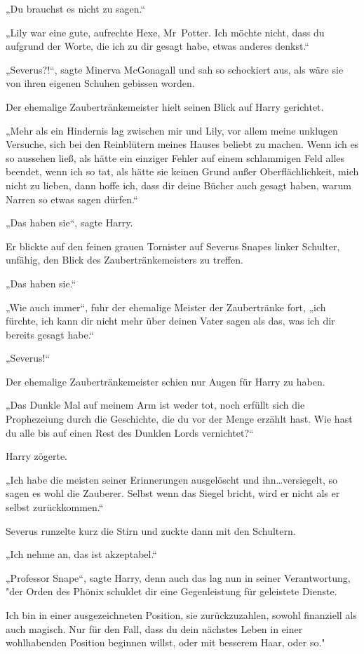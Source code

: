 {„Du brauchst es nicht zu sagen.“

„Lily war eine gute, aufrechte Hexe, Mr~Potter. Ich möchte nicht, dass du aufgrund der Worte, die ich zu dir gesagt habe, etwas anderes denkst.“

„Severus?!“, sagte Minerva McGonagall und sah so schockiert aus, als wäre sie von ihren eigenen Schuhen gebissen worden.

Der ehemalige Zaubertränkemeister hielt seinen Blick auf Harry gerichtet.

„Mehr als ein Hindernis lag zwischen mir und Lily, vor allem meine unklugen Versuche, sich bei den Reinblütern meines Hauses beliebt zu machen. Wenn ich es so aussehen ließ, als hätte ein einziger Fehler auf einem schlammigen Feld alles beendet, wenn ich so tat, als hätte sie keinen Grund außer Oberflächlichkeit, mich nicht zu lieben, dann hoffe ich, dass dir deine Bücher auch gesagt haben, warum Narren so etwas sagen dürfen.“

„Das haben sie“, sagte Harry.

Er blickte auf den feinen grauen Tornister auf Severus Snapes linker Schulter, unfähig, den Blick des Zaubertränkemeisters zu treffen.

„Das haben sie.“

„Wie auch immer“, fuhr der ehemalige Meister der Zaubertränke fort, „ich fürchte, ich kann dir nicht mehr über deinen Vater sagen als das, was ich dir bereits gesagt habe.“

„Severus!“

Der ehemalige Zaubertränkemeister schien nur Augen für Harry zu haben.

„Das Dunkle Mal auf meinem Arm ist weder tot, noch erfüllt sich die Prophezeiung durch die Geschichte, die du vor der Menge erzählt hast. Wie hast du alle bis auf einen Rest des Dunklen Lords vernichtet?“

Harry zögerte.

„Ich habe die meisten seiner Erinnerungen ausgelöscht und ihn…versiegelt, so sagen es wohl die Zauberer. Selbst wenn das Siegel bricht, wird er nicht als er selbst zurückkommen.“

Severus runzelte kurz die Stirn und zuckte dann mit den Schultern.

„Ich nehme an, das ist akzeptabel.“

„Professor Snape“, sagte Harry, denn auch das lag nun in seiner Verantwortung, "der Orden des Phönix schuldet dir eine Gegenleistung für geleistete Dienste.

Ich bin in einer ausgezeichneten Position, sie zurückzuzahlen, sowohl finanziell als auch magisch. Nur für den Fall, dass du dein nächstes Leben in einer wohlhabenden Position beginnen willst, oder mit besserem Haar, oder so."

}
